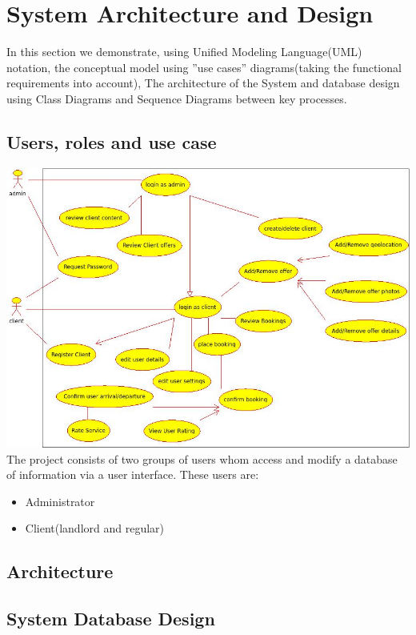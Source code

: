 \chapter*{System Architecture and Design}

In this section we demonstrate, using Unified Modeling Language(UML) notation, the conceptual model using  ''use cases'' diagrams(taking the functional requirements into account), The architecture of the System and database design using Class Diagrams and  Sequence Diagrams between key processes.

\section*{Users, roles and use case}
\includegraphics[scale=0.6]{img/use_case_project.jpeg}
\clearpage
The project consists of two groups of users whom access and modify a database of information via a user interface. These users are:
\begin{itemize}
\item Administrator 
\item Client(landlord and regular)
\end{itemize}

\section*{Architecture}
\section*{System Database Design}